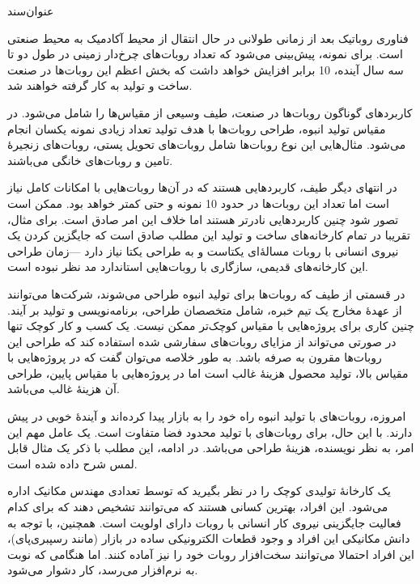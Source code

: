 \documentclass{cake-classes/short-report-fa}
\newcommand{\کیک}{مجموعهٔ کیکْ روباتیک}
\begin{document}
‌عنوان‌سند


فناوری روباتیک بعد از زمانی طولانی در حال انتقال از محیط آکادمیک به محیط صنعتی است.
برای نمونه، پیش‌بینی می‌شود که تعداد روبات‌های چرخ‌دار زمینی در طول دو تا سه سال آینده، 10 برابر افزایش خواهد داشت که بخش اعظم این روبات‌ها در صنعت ساخت و تولید به کار گرفته خواهند شد. 

کاربردهای گوناگون روبات‌ها در صنعت، طیف وسیعی از مقیاس‌ها را شامل می‌شود. در مقیاس تولید انبوه، طراحی روبات‌ها با هدف تولید تعداد زیادی نمونه یکسان انجام می‌شود.
مثال‌هایی این نوع روبات‌ها شامل روبات‌های تحویل پستی، روبات‌های زنجیرهٔ تامین و روبات‌های خانگی می‌باشند.

در انتهای دیگر طیف، کاربردهایی هستند که در آن‌ها روبات‌هایی با امکانات کامل نیاز است اما تعداد این روبات‌ها در حدود 10 نمونه و حتی کمتر خواهد بود.
ممکن است تصور شود چنین کاربردهایی نادرتر هستند اما خلاف این امر صادق است.
برای مثال، تقریبا در تمام کارخانه‌های ساخت و تولید این مطلب صادق است که جایگزین کردن یک نیروی انسانی با روبات مسالهٔ‌ای یکتاست و به طراحی یکتا نیاز دارد ---زمان طراحی این کارخانه‌های قدیمی، سازگاری با روبات‌هایی استاندارد مد نظر نبوده است.

در قسمتی از طیف که روبات‌ها برای تولید انبوه طراحی می‌شوند، شرکت‌ها می‌توانند از عهدهٔ مخارج یک تیم خبره، شامل متخصصان طراحی، برنامه‌نویسی و تولید بر آیند.
چنین کاری برای پروژه‌هایی با مقیاس کوچک‌تر ممکن نیست.
یک کسب و کار کوچک تنها در صورتی می‌تواند از مزایای روبات‌های سفارشی شده استفاده کند که طراحی این روبات‌ها مقرون به صرفه باشد.
به طور خلاصه می‌توان گفت که در پروژه‌هایی با مقیاس بالا، تولید محصول هزینه‌ٔ غالب است اما در پروژه‌هایی با مقیاس پایین، طراحی آن هزینهٔ غالب می‌باشد.

امروزه، روبات‌های با تولید انبوه راه خود را به بازار پیدا کرده‌اند و آیندهٔ خوبی در پیش دارند. با این حال، برای روبات‌های با تولید محدود فضا متفاوت است. یک عامل مهم این امر، به نظر نویسنده، هزینهٔ طراحی می‌باشد. در ادامه، این مطلب با ذکر یک مثال قابل لمس شرح داده شده است.


یک کارخانهٔ تولیدی کوچک را در نظر بگیرید که توسط تعدادی مهندس مکانیک اداره می‌شود.
این افراد، بهترین کسانی هستند که می‌توانند تشخیص دهند که برای کدام فعالیت جایگزینی نیروی کار انسانی با روبات دارای اولویت است.
همچنین، با توجه به دانش مکانیکی این افراد و وجود قطعات الکترونیکی ساده در بازار (مانند رسپبری‌پای)، این افراد احتمالا می‌توانند سخت‌افزار روبات خود را نیز آماده کنند.
اما هنگامی که نوبت به نرم‌افزار می‌رسد، کار دشوار می‌شود.
\end{document}
